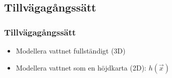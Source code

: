 \subsection{Tillvägagångssätt}

\begin{frame}
\frametitle{Tillvägagångssätt}

\begin{itemize}[<+(1)->]
\item Modellera vattnet fullständigt (3D)
\item Modellera vattnet som en höjdkarta (2D): $h(\vec{x})$

\end{itemize}

\end{frame}